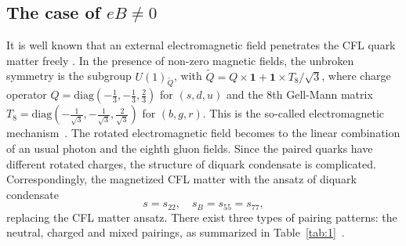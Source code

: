 \documentclass[prd, showpacs,nofootinbib,amsmath,amssymb,12pt]{revtex4}
\begin{document}
\subsection{The case of $eB \neq 0$}
It is well known that an external electromagnetic field penetrates the CFL quark matter freely \cite{ferrer2005magnetic,  ferrer2006color,ferrer2007magnetic,noronha2007color}.
In the presence of non-zero magnetic fields, the unbroken symmetry is the subgroup $U(1)_{\widetilde{Q}}$, with $\widetilde{Q}=Q\times\bm{1}+\bm{1}\times T_8/\sqrt{3}$, where charge operator $Q=\text{diag}(-\frac{1}{3},-\frac{1}{3},\frac{2}{3})$ for $(s,d,u)$ and the 8th Gell-Mann matrix $T_8=\text{diag}(-\frac{1}{\sqrt{3}},-\frac{1}{\sqrt{3}},\frac{2}{\sqrt{3}})$ for $(b,g,r)$. 
This is the so-called electromagnetic mechanism~\cite{alford1999mg}.
The rotated electromagnetic field becomes to the linear combination of an usual photon and the eighth gluon fields. 
Since the paired quarks have different rotated charges, the  structure of diquark condensate is complicated.
Correspondingly, the magnetized CFL matter with the ansatz of diquark condensate 
\begin{equation}
s=s_{22},\quad s_B=s_{55}=s_{77},
\label{splitting}
\end{equation}
replacing the CFL matter ansatz.
There exist three types of pairing patterns: the neutral, charged and mixed pairings, as summarized in Table~\ref{tab:1}~\cite{ferrer2005magnetic}.
\end{document}
